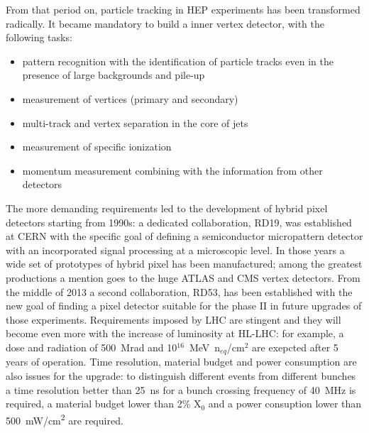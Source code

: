     From that period on, particle tracking in HEP experiments has been transformed radically. It became mandatory to build a inner vertex detector, with the following tasks:
    \begin{itemize}
        \item pattern recognition with the identification of particle tracks even in the presence of large backgrounds and pile-up
        \item measurement of vertices (primary and secondary)
        \item multi-track and vertex separation in the core of jets
        \item measurement of specific ionization
        \item momentum measurement combining with the information from other detectors 
    \end{itemize}

    The more demanding requirements led to the development of hybrid pixel detectors starting from 1990s: a dedicated collaboration, RD19, was established at CERN with the specific goal of defining a semiconductor micropattern detector with an incorporated signal processing at a microscopic level. 
    In those years a wide set of prototypes of hybrid pixel has been manufactured; among the greatest productions a mention goes to the huge ATLAS and CMS vertex detectors. 
    From the middle of 2013 a second collaboration, RD53, has been established with the new goal of finding a pixel detector suitable for the phase II in future upgrades of those experiments. Requirements imposed by LHC are stingent and they will become even more with the increase of luminosity at HL-LHC: for example, a dose and radiation of \SI{500}{Mrad} and 10$^{16}$~MeV~n$_{eq}$/cm$^2$ are exepcted after 5 years of operation. Time resolution, material budget and power consumption are also issues for the upgrade: to distinguish different events from different bunches a time resolution better than \SI{25}{ns} for a bunch crossing frequency of \SI{40}{MHz} is required, a material budget lower than 2\% X$_0$ and a power consuption lower than \SI{500}{mW/cm\squared} are required. 

